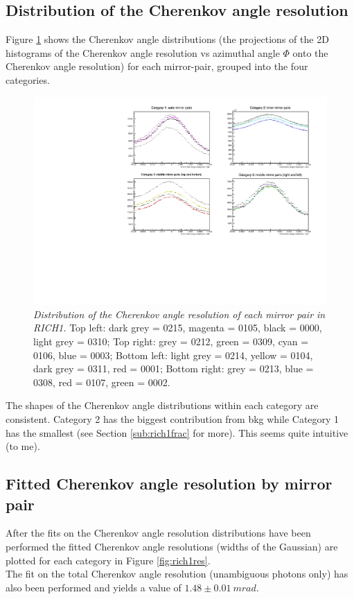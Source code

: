 \subsection{Distribution of the Cherenkov angle resolution}
\label{subsec:rich1dis}
Figure \ref{fig:rich1cherenkov} shows the Cherenkov angle distributions (the projections of the 2D histograms of the Cherenkov angle resolution vs azimuthal angle $\Phi$ onto the Cherenkov angle resolution) for each mirror-pair, grouped into the four categories.\\
\begin{figure}[!h]
	\vspace*{-0.cm}
	\begin{center}
		\includegraphics[width=1.\textwidth]{rich1.pdf}
		\vspace*{-1.5cm}
	\end{center}
	\caption{\textit{Distribution of the Cherenkov angle resolution of each mirror pair in RICH1.} Top left: dark grey = 0215, magenta = 0105, black = 0000, light grey = 0310; Top right: grey = 0212, green = 0309, cyan = 0106, blue = 0003; Bottom left: light grey = 0214, yellow = 0104, dark grey = 0311, red = 0001; Bottom right: grey = 0213, blue = 0308, red = 0107, green = 0002. }
	\label{fig:rich1cherenkov}
\end{figure}
The shapes of the Cherenkov angle distributions within each category are consistent. Category 2 has the biggest contribution from bkg while Category 1 has the smallest (see Section \ref{sub:rich1frac} for more). This seems quite intuitive (to me).\\

\newpage
\subsection{Fitted Cherenkov angle resolution by mirror pair}
After the fits on the Cherenkov angle resolution distributions have been performed the fitted Cherenkov angle resolutions (widths of the Gaussian) are plotted for each category in Figure \ref{fig:rich1res}.\\
The fit on the total Cherenkov angle resolution (unambiguous photons only) has also been performed and yields a value of $1.48 \pm 0.01 \ mrad$.\\

